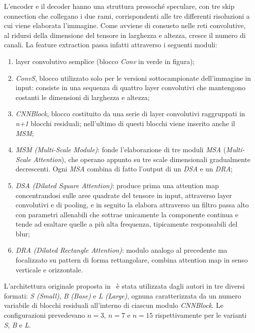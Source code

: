 \documentclass[a4paper,10pt,twocolumn]{article}
\begin{document}
L'encoder e il decoder hanno una struttura pressoché speculare, con tre skip connection che collegano i due rami, corrispondenti alle tre differenti risoluzioni a cui viene elaborata l'immagine. Come avviene di consueto nelle reti convolutive,
al ridursi della dimensione del tensore in larghezza e altezza, cresce il numero di canali. La feature extraction passa infatti attraverso i seguenti moduli:
\begin{enumerate}[label=\textbf{(\alph*)}]
  \item layer convolutivo semplice (blocco \textit{Conv} in verde in figura);
  \item \textit{ConvS}, blocco utilizzato solo per le versioni sottocampionate dell'immagine in input: consiste in una sequenza di quattro layer convolutivi che mantengono costanti le dimensioni di larghezza e altezza;
  \item \textit{CNNBlock}, blocco costituito da una serie di layer convolutivi raggruppati in \textit{n+1} blocchi residuali; nell'ultimo di questi blocchi viene inserito anche il \textit{MSM};
  \item \textit{MSM (Multi-Scale Module)}: fonde l'elaborazione di tre moduli \textit{MSA} (\textit{Multi-Scale Attention}), che operano appunto su tre scale dimensionali gradualmente decrescenti.
    Ogni \textit{MSA} combina di fatto l'output di un \textit{DSA} e un \textit{DRA};
  \item \textit{DSA (Dilated Square Attention)}: produce prima una attention map concentrandosi sulle aree quadrate del tensore in input, attraverso layer convolutivi e di pooling,
    e in seguito la elabora attraverso un filtro passa alto con parametri allenabili che sottrae unicamente la componente continua e tende ad esaltare quelle a più alta frequenza,
    tipicamente responsabili del blur;
  \item \textit{DRA (Dilated Rectangle Attention)}: modulo analogo al precedente ma focalizzato su pattern di forma rettangolare, combina attention map in senso verticale e orizzontale.
\end{enumerate}

L'architettura originale proposta in~\cite{convir} è stata utilizzata dagli autori in tre diversi formati: \textit{S (Small)}, \textit{B (Base)} e \textit{L (Large)}, ognuna caratterizzata da un numero variabile di blocchi residuali all'interno di ciascun modulo \textit{CNNBlock}.
Le configurazioni prevedevano \(n=3\), \(n=7\) e \(n=15\) rispettivamente per le varianti \textit{S}, \textit{B} e \textit{L}.
\end{document}
